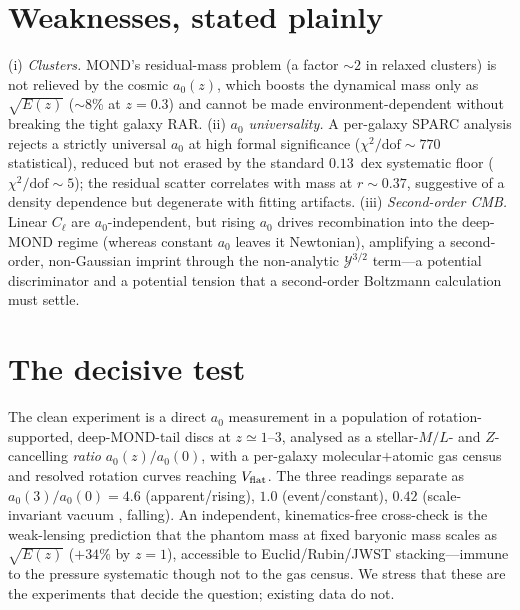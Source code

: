 \documentclass[11pt]{article}
\newcommand{\az}{a_0}
\newcommand{\Ez}{E(z)}
\begin{document}
\section{Weaknesses, stated plainly}
(i) \emph{Clusters.} MOND's residual-mass problem (a factor ${\sim}2$ in relaxed clusters) is not
relieved by the cosmic $\az(z)$, which boosts the dynamical mass only as $\sqrt{\Ez}$ ($\sim$8\% at
$z=0.3$) and cannot be made environment-dependent without breaking the tight galaxy RAR.
(ii) \emph{$\az$ universality.} A per-galaxy SPARC analysis rejects a strictly universal $\az$ at high
formal significance ($\chi^2/\mathrm{dof}\!\sim\!770$ statistical), reduced but not erased by the
standard $0.13$~dex systematic floor ($\chi^2/\mathrm{dof}\!\sim\!5$); the residual scatter correlates
with mass at $r\!\sim\!0.37$, suggestive of a density dependence but degenerate with fitting artifacts.
(iii) \emph{Second-order CMB.} Linear $C_\ell$ are $\az$-independent, but rising $\az$ drives
recombination into the deep-MOND regime (whereas constant $\az$ leaves it Newtonian), amplifying a
second-order, non-Gaussian imprint through the non-analytic $\mathcal{Y}^{3/2}$ term---a potential
discriminator and a potential tension that a second-order Boltzmann calculation must settle.

\section{The decisive test}
The clean experiment is a direct $\az$ measurement in a population of rotation-supported, deep-MOND-tail
discs at $z\simeq1$--$3$, analysed as a stellar-$M/L$- and $Z$-cancelling \emph{ratio} $\az(z)/\az(0)$,
with a per-galaxy molecular$+$atomic gas census and resolved rotation curves reaching $V_{\rm flat}$.
The three readings separate as $\az(3)/\az(0)=4.6$ (apparent/rising), $1.0$ (event/constant), $0.42$
(scale-invariant vacuum \cite{maeder2017}, falling). An independent, kinematics-free cross-check is the
weak-lensing prediction that the phantom mass at fixed baryonic mass scales as $\sqrt{\Ez}$
($+34\%$ by $z=1$), accessible to Euclid/Rubin/JWST stacking---immune to the pressure systematic though
not to the gas census. We stress that these are the experiments that decide the question; existing data
do not.
\end{document}

